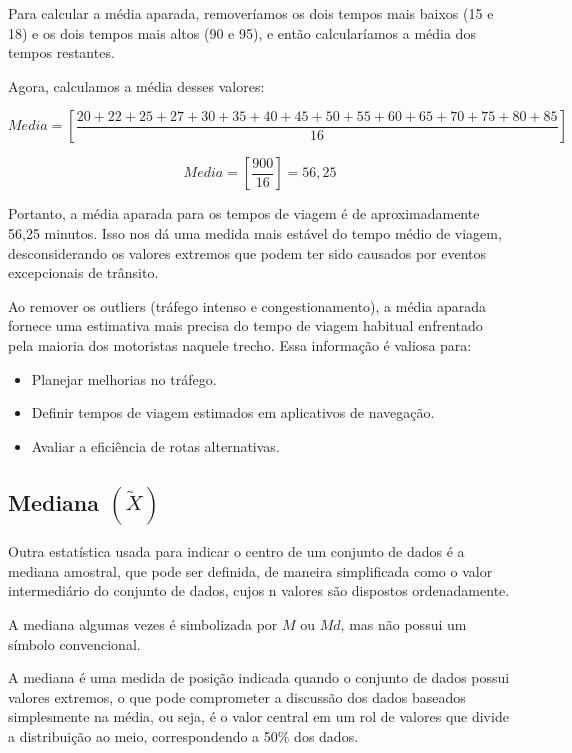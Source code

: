 Para calcular a média aparada, removeríamos os dois tempos mais baixos (15 e 18) e os dois tempos mais altos (90 e 95), e então calcularíamos a média dos tempos restantes.\vskip0.3cm

Agora, calculamos a média desses valores:

$$
Media = \left[\frac{20+22+25+27+30+35+40+45+50+55+60+65+70+75+80+85}{16} \right]
$$

$$
Media =  \left[\frac{900}{16}  \right]= 56,25
$$

Portanto, a média aparada para os tempos de viagem é de aproximadamente 56,25 minutos. Isso nos dá uma medida mais estável do tempo médio de viagem, desconsiderando os valores extremos que podem ter sido causados por eventos excepcionais de trânsito.\vskip0.3cm


Ao remover os outliers (tráfego intenso e congestionamento), a média aparada fornece uma estimativa mais precisa do tempo de viagem habitual enfrentado pela maioria dos motoristas naquele trecho. Essa informação é valiosa para:

\begin{itemize}
    \item Planejar melhorias no tráfego.
    \item Definir tempos de viagem estimados em aplicativos de navegação.
    \item Avaliar a eficiência de rotas alternativas.
\end{itemize}




\newpage
\subsection{Mediana $(\widetilde{X})$}

Outra estatística usada para indicar o centro de um conjunto de dados é a mediana amostral, que pode ser definida, de maneira simplificada como o valor intermediário do conjunto de dados, cujos n valores são dispostos ordenadamente.\vskip0.3cm

A mediana algumas vezes é simbolizada por $M$ ou $Md$, mas não possui um símbolo convencional.\vskip0.3cm

A mediana é uma medida de posição indicada quando o conjunto de dados possui valores extremos,
o que pode comprometer a discussão dos dados baseados simplesmente na média, ou seja, é o
valor central em um rol de valores que divide a distribuição ao meio, correspondendo a 50\% dos dados.\vskip0.3cm

